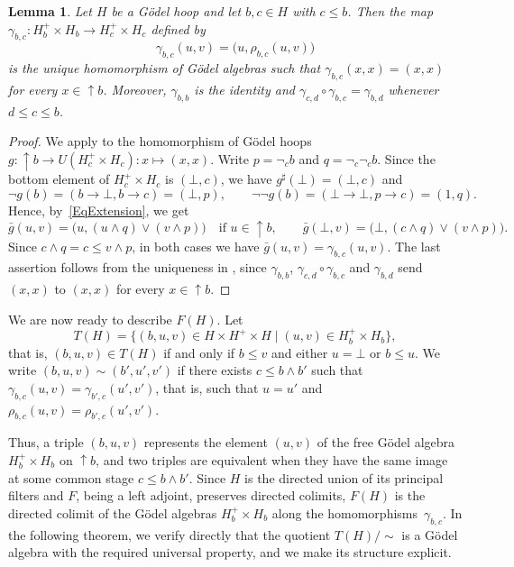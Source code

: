 \documentclass[reqno,a4paper]{amsart}
\theoremstyle{plain}
\newtheorem{lemma}[subsection]{Lemma}
\theoremstyle{definition}
\theoremstyle{remark}
\numberwithin{equation}{section}
\newcommand{\up}{{\uparrow}}
\begin{document}
\begin{lemma}\label{LemTransition}
Let $H$ be a G\"odel hoop and let $b,c\in H$ with $c\leq b$. Then the map $\gamma_{b,c}\colon H_b^+\times H_b\to H_c^+\times H_c$ defined by
\[
\gamma_{b,c}(u,v)=\bigl(u,\rho_{b,c}(u,v)\bigr)
\]
is the unique homomorphism of G\"odel algebras such that $\gamma_{b,c}(x,x)=(x,x)$ for every $x\in{\up}b$. Moreover, $\gamma_{b,b}$ is the identity and $\gamma_{c,d}\circ\gamma_{b,c}=\gamma_{b,d}$ whenever $d\leq c\leq b$.
\end{lemma}

\begin{proof}
We apply  to the homomorphism of G\"odel hoops $g\colon{\up}b\to U(H_c^+\times H_c)\colon x\mapsto(x,x)$. Write $p=\neg_c b$ and $q=\neg_c\neg_c b$. Since the bottom element of $H_c^+\times H_c$ is $(\bot,c)$, we have $g^\sharp(\bot)=(\bot,c)$ and
\[
\neg g(b)=(b\to\bot,b\to c)=(\bot,p),\qquad \neg\neg g(b)=(\bot\to\bot,p\to c)=(1,q).
\]
Hence, by~\eqref{EqExtension}, we get
\[
\bar g(u,v)=\bigl(u,(u\wedge q)\vee(v\wedge p)\bigr)\quad\text{if }u\in{\up}b,\qquad \bar g(\bot,v)=\bigl(\bot,(c\wedge q)\vee(v\wedge p)\bigr).
\]
Since $c\wedge q=c\leq v\wedge p$, in both cases we have $\bar g(u,v)=\gamma_{b,c}(u,v)$. The last assertion follows from the uniqueness in , since $\gamma_{b,b}$, $\gamma_{c,d}\circ\gamma_{b,c}$ and $\gamma_{b,d}$ send $(x,x)$ to $(x,x)$ for every $x\in{\up}b$.
\end{proof}

We are now ready to describe $F(H)$. Let
\[
T(H)=\bigl\{(b,u,v)\in H\times H^+\times H\mid (u,v)\in H_b^+\times H_b\bigr\},
\]
that is, $(b,u,v)\in T(H)$ if and only if $b\leq v$ and either $u=\bot$ or $b\leq u$. We write $(b,u,v)\sim(b',u',v')$ if there exists $c\leq b\wedge b'$ such that $\gamma_{b,c}(u,v)=\gamma_{b',c}(u',v')$, that is, such that $u=u'$ and $\rho_{b,c}(u,v)=\rho_{b',c}(u',v')$.

Thus, a triple $(b,u,v)$ represents the element $(u,v)$ of the free G\"odel algebra $H_b^+\times H_b$ on ${\up}b$, and two triples are equivalent when they have the same image at some common stage $c\leq b\wedge b'$. Since $H$ is the directed union of its principal filters and $F$, being a left adjoint, preserves directed colimits, $F(H)$ is the directed colimit of the G\"odel algebras $H_b^+\times H_b$ along the homomorphisms~$\gamma_{b,c}$. In the following theorem, we verify directly that the quotient $T(H)/{\sim}$ is a G\"odel algebra with the required universal property, and we make its structure explicit.
\end{document}
